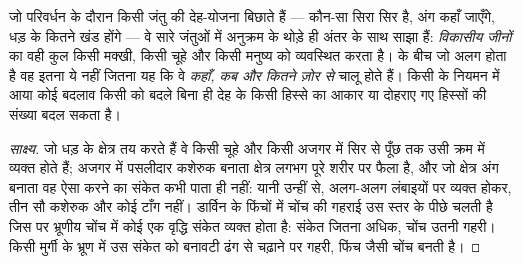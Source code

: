 \begin{proposition}\label{prop:g12:diversification-of-life:development}
जो  परिवर्धन के दौरान किसी जंतु की देह-योजना बिछाते हैं --- कौन-सा सिरा
सिर है, अंग कहाँ जाएँगे, धड़ के कितने खंड होंगे --- वे सारे जंतुओं में
अनुक्रम के थोड़े ही अंतर के साथ साझा हैं: \emph{विकासीय जीनों}
का वही कुल किसी मक्खी, किसी चूहे और किसी मनुष्य को व्यवस्थित करता है।
 के बीच जो अलग होता है वह इतना ये  नहीं जितना यह कि वे
\emph{कहाँ, कब और कितने ज़ोर से} चालू होते हैं। किसी  के नियमन
में आया कोई बदलाव किसी  को बदले बिना ही देह के किसी हिस्से का आकार
या दोहराए गए हिस्सों की संख्या बदल सकता है।
\end{proposition}
\begin{proof}[साक्ष्य]
जो  धड़ के क्षेत्र तय करते हैं वे किसी चूहे और किसी अजगर में सिर से पूँछ
तक उसी क्रम में व्यक्त होते हैं; अजगर में पसलीदार कशेरुक बनाता क्षेत्र
लगभग पूरे शरीर पर फैला है, और जो क्षेत्र अंग बनाता वह ऐसा करने का संकेत कभी
पाता ही नहीं: यानी उन्हीं  से, अलग-अलग लंबाइयों पर व्यक्त होकर, तीन सौ
कशेरुक और कोई टाँग नहीं। डार्विन के फिंचों में चोंच की गहराई उस स्तर के पीछे
चलती है जिस पर भ्रूणीय चोंच में कोई एक वृद्धि संकेत व्यक्त होता है: संकेत
जितना अधिक, चोंच उतनी गहरी। किसी मुर्गी के भ्रूण में उस संकेत को बनावटी ढंग
से चढ़ाने पर गहरी, फिंच जैसी चोंच बनती है।
\end{proof}

